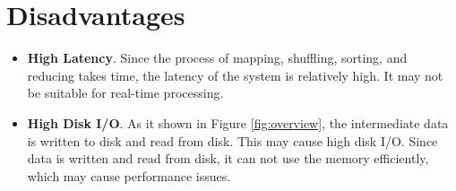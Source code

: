 \documentclass[10pt]{article}
\begin{document}
\section{Disadvantages}

\begin{itemize}
    \item \textbf{High Latency}. Since the process of mapping, shuffling, sorting, and reducing takes time, the latency of the system is relatively high. It may not be suitable for real-time processing.
    \item \textbf{High Disk I/O}. As it shown in Figure \ref{fig:overview}, the intermediate data is written to disk and read from disk. This may cause high disk I/O. Since data is written and read from disk, it can not use the memory efficiently, which may cause performance issues.
\end{itemize}
\end{document}

